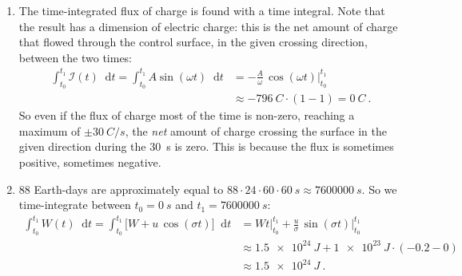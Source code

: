 \documentclass[a4paper,12pt,%
onecolumn,oneside,%
british%
]{memoir}
\newcommand*{\di}{\mathop{}\!\mathrm{d}}%
\renewcommand*{\|}[1][]{\nonscript\:#1\vert\nonscript\:\mathopen{}}
\newcommand*{\yti}{t_{0}}
\newcommand*{\ytf}{t_{1}}
\newcommand*{\dt}{\di t}
\newcommand*{\yH}{W}
\newcommand*{\yI}{\mathcal{I}}
\begin{document}
\begin{enumerate}[exerc]
\item The time-integrated flux of charge is found with a time integral. Note that the result has a dimension of electric charge: this is the net amount of charge that flowed through the control surface, in the given crossing direction, between the two times:
  \begin{equation*}
    \begin{aligned}
      \int_{\yti}^{\ytf}\yI(t)\dt =
      \int_{\yti}^{\ytf}A \sin(\omega t)\dt
      &=
      -\frac{A}{\omega}\, \cos(\omega t)\Bigr\rvert_{\yti}^{\ytf}
      \\&\approx -\qty{796}{C}\cdot (1-1) = \qty{0}{C} \ .
    \end{aligned}
  \end{equation*}
  So even if the flux of charge most of the time is non-zero, reaching a maximum of $\pm\qty{30}{C/s}$, the \emph{net} amount of charge crossing the surface in the given direction during the \qty{30}{s} is zero. This is because the flux is sometimes positive, sometimes negative.

\item 88 Earth-days are approximately equal to $88\cdot 24\cdot 60\cdot \qty{60}{s} \approx \qty{7600000}{s}$. So we time-integrate between $\yti=\qty{0}{s}$ and $\ytf=\qty{7600000}{s}$:
  \begin{equation*}
    \begin{aligned}
      \int_{\yti}^{\ytf}\yH(t)\dt =
      \int_{\yti}^{\ytf}\bigl[W + u\, \cos(\sigma t)\bigr]\dt &=
      W t\Bigr\rvert_{\yti}^{\ytf} +
      \frac{u}{\sigma}\, \sin(\sigma t)\Bigr\rvert_{\yti}^{\ytf}
      \\[1ex]
      &\approx \qty{1.5e24}{J} +
      \qty{1e23}{J}\cdot (-0.2 - 0)
      \\&\approx \qty{1.5e24}{J} \ .
    \end{aligned}
  \end{equation*}


\end{enumerate}
\end{document}
